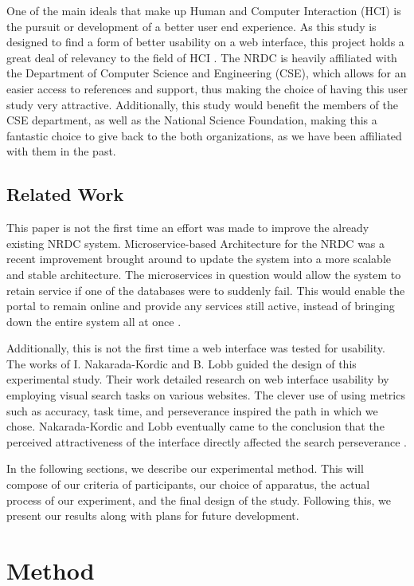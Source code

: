 \documentclass{acm_proc_article-sp}
\begin{document}
One of the main ideals that make up Human and Computer Interaction (HCI) is the pursuit or development of a better user end experience\cite{hci-research-perspective}. As this study is designed to find a form of better usability on a web interface, this project holds a great deal of relevancy to the field of HCI \cite{web-ui-principles,dontmakemethink}. The NRDC is heavily affiliated with the Department of Computer Science and Engineering (CSE), which allows for an easier access to references and support, thus making the choice of having this user study very attractive. Additionally, this study would benefit the members of the CSE department, as well as the National Science Foundation, making this a fantastic choice to give back to the both organizations, as we have been affiliated with them in the past.

%
\subsection{Related Work}
This paper is not the first time an effort was made to improve the already existing NRDC system. Microservice-based Architecture for the NRDC was a recent improvement brought around to update the system into a more scalable and stable architecture. The microservices in question would allow the system to retain service if one of the databases were to suddenly fail. This would enable the portal to remain online and provide any services still active, instead of bringing down the entire system all at once \cite{microservice-nrdc}.

Additionally, this is not the first time a web interface was tested for usability. The works of I. Nakarada-Kordic and B. Lobb guided the design of this experimental study. Their work detailed research on web interface usability by employing visual search tasks on various websites. The clever use of using metrics such as accuracy, task time, and perseverance inspired the path in which we chose. Nakarada-Kordic and Lobb eventually came to the conclusion that the perceived attractiveness of the interface directly affected the search perseverance \cite{PerceivedAttractiveness}. 

In the following sections, we describe our experimental method. This will compose of our criteria of participants, our choice of apparatus, the actual process of our experiment, and the final design of the study. Following this, we present our results along with plans for future development.

%
%
\section{Method}
%
\end{document}
